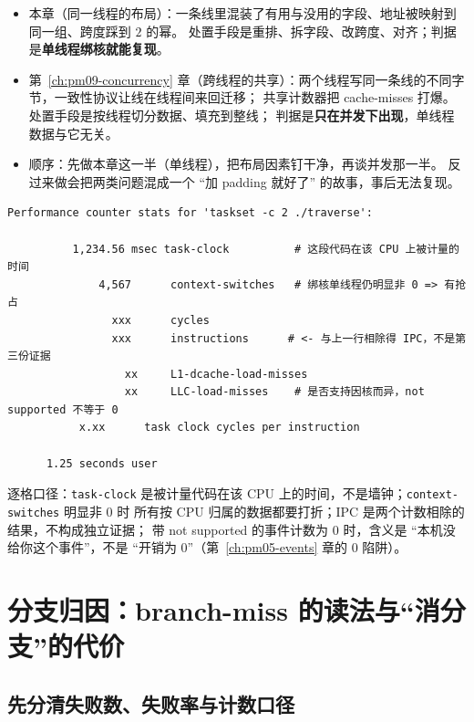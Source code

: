 \documentclass[12pt,a4paper,fontset=fandol]{ctexbook}
\newcommand{\Fn}[1]{\texttt{#1()}}
\newcommand{\Tp}[1]{\texttt{#1}}
\newcommand{\Bk}{\discretionary{}{}{}}
\newcommand{\Mx}[1]{\textsf{#1}}
\begin{document}
\begin{note}[title={同一条缓存线，两套解释：本章与第 9 章的分工},label={box:pm06-vs09}]
\begin{itemize}
\item 本章（同一线程的布局）：一条线里混装了有用与没用的字段、地址被映射到同一组、跨度踩到 $2$ 的幂。
  处置手段是重排、拆字段、改跨度、对齐；判据是\textbf{单线程绑核就能复现}。
\item 第~\ref{ch:pm09-concurrency} 章（跨线程的共享）：两个线程写同一条线的不同字节，一致性协议让线在线程间来回迁移；
  共享计数器把 \Mx{cache{\Bk}-misses} 打爆。处置手段是按线程切分数据、填充到整线；
  判据是\textbf{只在并发下出现}，单线程数据与它无关。
\item 顺序：先做本章这一半（单线程），把布局因素钉干净，再谈并发那一半。
  反过来做会把两类问题混成一个 ``加 padding 就好了'' 的故事，事后无法复现。
\end{itemize}
\end{note}

\begin{lstlisting}[style=outstyle,caption={一段 \Fn{perf} stat 输出的字段读法（格式示例，非本仓库实测值）},label={lst:pm06-stat}]
 Performance counter stats for 'taskset -c 2 ./traverse':

          1,234.56 msec task-clock          # 这段代码在该 CPU 上被计量的时间
              4,567      context-switches   # 绑核单线程仍明显非 0 => 有抢占
                xxx      cycles
                xxx      instructions      # <- 与上一行相除得 IPC，不是第三份证据
                  xx     L1-dcache-load-misses
                  xx     LLC-load-misses    # 是否支持因核而异，not supported 不等于 0
           x.xx      task clock cycles per instruction

      1.25 seconds user
\end{lstlisting}

逐格口径：\Tp{task{\Bk}-clock} 是被计量代码在该 CPU 上的时间，不是墙钟；\Tp{context{\Bk}-switches} 明显非 0 时
所有按 CPU 归属的数据都要打折；\Mx{IPC} 是两个计数相除的结果，不构成独立证据；
带 not supported 的事件计数为 $0$ 时，含义是 ``本机没给你这个事件''，不是 ``开销为 0''（第~\ref{ch:pm05-events} 章的 0 陷阱）。

\section{分支归因：\Mx{branch{\Bk}-miss} 的读法与``消分支''的代价}
\label{sec:pm06-branch}

\subsection{先分清失败数、失败率与计数口径}
\end{document}

